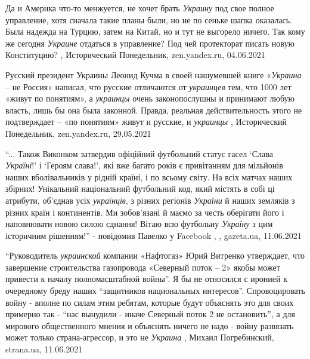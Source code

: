 Да и Америка что-то менжуется, не хочет брать \emph{Украину} под свое полное
управление, хотя сначала такие планы были, но не по сеньке шапка оказалась.
Была надежда на Турцию, затем на Китай, но и тут не выгорело ничего.  Так кому
же сегодня \emph{Украине} отдаться в управление? Под чей протекторат писать новую
Конституцию?
, 
Исторический Понедельник, zen.yandex.ru, 04.06.2021

Русский президент Украины Леонид Кучма в своей нашумевшей книге «\emph{Украина} – не
Россия» написал, что русские отличаются от \emph{украинцев} тем, что 1000 лет «живут
по понятиям», а \emph{украинцы} очень законопослушны и принимают любую власть, лишь бы
она была законной. Правда, реальная действительность этого не подтверждает –
«по понятиям» живут и русские, и \emph{украинцы}
, 
Исторический Понедельник, zen.yandex.ru, 29.05.2021

\enquote{... Також Виконком затвердив офіційний футбольний статус гасел \enquote{Слава \emph{Україні}!} і
\enquote{Героям слава!}, які вже багато років є привітанням для мільйонів наших
вболівальників у рідній країні, і по всьому світу. На всіх матчах наших
збірних!  Унікальний національний футбольний код, який містять в собі ці
атрибути, об'єднав усіх \emph{українців}, з різних регіонів \emph{України} й наших земляків з
різних країн і континентів. Ми зобов'язані й маємо за честь оберігати його і
наповнювати новою силою єднання! Вітаю всю футбольну \emph{Україну} з цим історичним
рішенням!} - повідомив Павелко у Facebook
, , gazeta.ua, 11.06.2021

\enquote{Руководитель \emph{украинской} компании «Нафтогаз» Юрий Витренко
утверждает, что завершение строительства газопровода «Северный поток – 2» якобы
может привести к началу полномасштабной войны}.  Я бы не относился с иронией к
очередному бреду наших \enquote{защитников национальных интересов}.
Спровоцировать войну - вполне по силам этим ребятам, которые будут объяснять
это для своих примерно так - \enquote{нас вынудили - иначе Северный поток 2 не
остановить}, а для мирового общественного мнения и объяснять ничего не надо -
войну развязать может только страна-агрессор, и это не \emph{Украина}
, Михаил Погребинский, strana.ua, 11.06.2021

